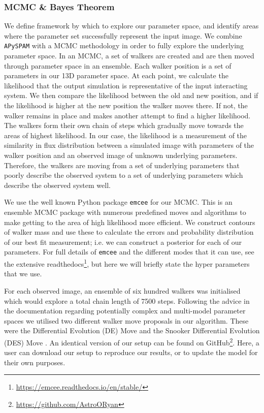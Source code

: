 \subsubsection{MCMC \& Bayes Theorem}
We define framework by which to explore our parameter space, and identify areas where the parameter set successfully represent the input image. We combine \texttt{APySPAM} with a MCMC methodology in order to fully explore the underlying parameter space. In an MCMC, a set of walkers are created and are then moved through parameter space in an ensemble. Each walker position is a set of parameters in our 13D parameter space. At each point, we calculate the likelihood that the output simulation is representative of the input interacting system. We then compare the likelihood between the old and new position, and if the likelihood is higher at the new position the walker moves there. If not, the walker remains in place and makes another attempt to find a higher likelihood. The walkers form their own chain of steps which gradually move towards the areas of highest likelihood. In our case, the likelihood is a measurement of the similarity in flux distribution between a simulated image with parameters of the walker position and an observed image of unknown underlying parameters. Therefore, the walkers are moving from a set of underlying parameters that poorly describe the observed system to a set of underlying parameters which describe the observed system well. 

We use the well known Python package \texttt{emcee} \citep{Foreman-Mackey_13} for our MCMC. This is an ensemble MCMC package with numerous predefined moves and algorithms to make getting to the area of high likelihood more efficient. We construct contours of walker mass and use these to calculate the errors and probability distribution of our best fit measurement; i.e. we can construct a posterior for each of our parameters. For full details of \texttt{emcee} and the different modes that it can use, see the extensive readthedocs\footnote{\url{https://emcee.readthedocs.io/en/stable/}}, but here we will briefly state the hyper parameters that we use. 

For each observed image, an ensemble of six hundred walkers was initialised which would explore a total chain length of 7500 steps. Following the advice in the documentation regarding potentially complex and multi-model parameter spaces we utilised two different walker move proposals in our algorithm. These were the Differential Evolution (DE) Move \citep{Nelson_14} and the Snooker Differential Evolution (DES) Move \citep{ter_Braak_08}. An identical version of our setup can be found on GitHub\footnote{\url{https://github.com/AstroORyan}}. Here, a user can download our setup to reproduce our results, or to update the model for their own purposes.

